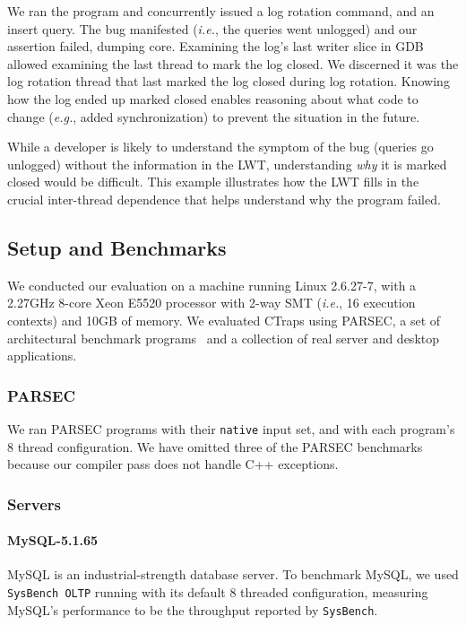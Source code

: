 \documentclass[preprint,9pt]{sigplanconf}
\newcommand{\ctraps}{CTraps\xspace}
\newcommand{\lwt}{LWT\xspace}
\begin{document}
We ran the program and concurrently issued a log rotation command, and an
insert query.  The bug manifested ({\em i.e.}, the queries went unlogged) and
our assertion failed, dumping core.  Examining the log's last writer slice in
GDB allowed examining the last thread to mark the log closed.  We discerned it
was the log rotation thread that last marked the log closed during log
rotation.  Knowing how the log ended up marked closed enables reasoning about
what code to change ({\em e.g.}, added synchronization) to prevent the
situation in the future.

While a developer is likely to understand the symptom of the bug (queries go
unlogged) without the information in the \lwt, understanding {\em why} it is marked closed would be
difficult.  This example illustrates how the \lwt fills in the crucial inter-thread
dependence that helps understand why the program failed.





\subsection{Setup and Benchmarks}

We conducted our evaluation on a machine running Linux 2.6.27-7, with a 2.27GHz
8-core Xeon E5520 processor with 2-way SMT ({\em i.e.}, 16 execution contexts)
and 10GB of memory.  We evaluated \ctraps using PARSEC, a set of architectural
benchmark programs~\cite{parsec} and a collection of real server and desktop
applications.    

\subsubsection{PARSEC}

We ran PARSEC programs with their {\tt native} input set, and with each
program's 8 thread configuration. We have omitted three of the PARSEC
benchmarks because our compiler pass does not handle C++ exceptions.    

\subsubsection{Servers}


\paragraph{MySQL-5.1.65} MySQL is an industrial-strength database
server. To benchmark MySQL, we used {\tt SysBench OLTP} running with its
default 8 threaded configuration, measuring MySQL's performance to be the
throughput reported by {\tt SysBench}.  
\end{document}
